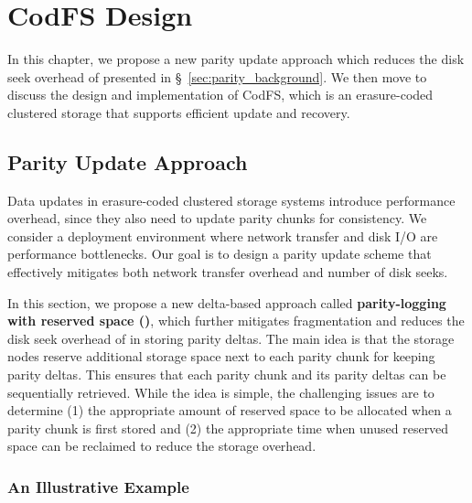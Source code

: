 \chapter{CodFS Design}
\label{chap:codfs}

In this chapter, we propose a new parity update approach which reduces the disk
seek overhead of \PL presented in \S~\ref{sec:parity_background}. We then move
to discuss the design and implementation of CodFS, which is an erasure-coded
clustered storage that supports efficient update and recovery.

\section{Parity Update Approach}
\label{sec:parity}

Data updates in erasure-coded clustered storage systems introduce performance
overhead, since they also need to update parity chunks for consistency.  We
consider a deployment environment where network transfer and disk I/O are
performance bottlenecks.  Our goal is to design a parity update scheme that
effectively mitigates both network transfer overhead and number of disk seeks.

In this section, we propose a new delta-based approach called {\bf parity-logging with reserved
space (\PLR)}, which further mitigates fragmentation and reduces the disk seek
overhead of \PL in storing parity deltas.  The main idea is that the storage
nodes reserve additional storage space next to each parity chunk for keeping 
parity deltas.  This ensures that each parity chunk and its parity deltas
can be sequentially retrieved. While the idea is simple, the challenging
issues are to determine (1) the appropriate amount of reserved space to be
allocated when a parity chunk is first stored and (2) the appropriate time
when unused reserved space can be reclaimed to reduce the storage overhead. 


\subsection{An Illustrative Example} 

